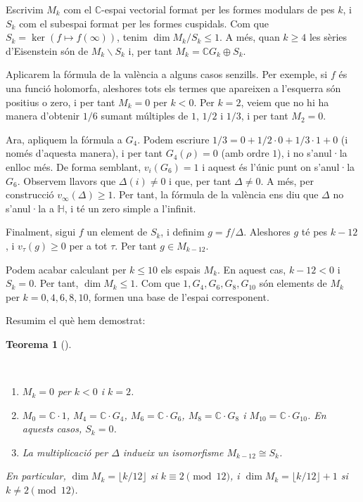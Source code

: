 \documentclass[
  letterpaper,
  DIV=11,
  numbers=noendperiod]{scrreprt}
\providecommand{\tightlist}{%
  \setlength{\itemsep}{0pt}\setlength{\parskip}{0pt}}\usepackage{longtable,booktabs,array}
\theoremstyle{plain}
\newtheorem{theorem}{Teorema}[chapter]
\theoremstyle{plain}
\theoremstyle{definition}
\theoremstyle{plain}
\theoremstyle{plain}
\theoremstyle{definition}
\theoremstyle{remark}
\begin{document}
Escrivim \(M_k\) com el \(\mathbb{C}\)-espai vectorial format per les
formes modulars de pes \(k\), i \(S_k\) com el subespai format per les
formes cuspidals. Com que \(S_k=\ker( f\mapsto f(\infty))\), tenim
\(\dim M_k/S_k\leq 1\). A més, quan \(k\geq 4\) les sèries d'Eisenstein
són de \(M_k\smallsetminus S_k\) i, per tant
\(M_k = \mathbb{C}G_k \oplus S_k\).

Aplicarem la fórmula de la valència a alguns casos senzills. Per
exemple, si \(f\) és una funció holomorfa, aleshores tots els termes que
apareixen a l'esquerra són positius o zero, i per tant \(M_k=0\) per
\(k<0\). Per \(k=2\), veiem que no hi ha manera d'obtenir \(1/6\) sumant
múltiples de \(1\), \(1/2\) i \(1/3\), i per tant \(M_2=0\).

Ara, apliquem la fórmula a \(G_4\). Podem escriure
\(1/3 = 0 + 1/2\cdot 0 + 1/3\cdot 1+0\) (i només d'aquesta manera), i
per tant \(G_4(\rho)=0\) (amb ordre \(1\)), i no s'anul·la enlloc més.
De forma semblant, \(v_{i}(G_6) = 1\) i aquest és l'únic punt on
s'anul·la \(G_6\). Observem llavors que \(\Delta(i)\neq 0\) i que, per
tant \(\Delta\neq 0\). A més, per construcció
\(v_{\infty}(\Delta)\geq 1\). Per tant, la fórmula de la valència ens
diu que \(\Delta\) no s'anul·la a \(\mathbb{H}\), i té un zero simple a
l'infinit.

Finalment, sigui \(f\) un element de \(S_k\), i definim \(g=f/\Delta\).
Aleshores \(g\) té pes \(k-12\), i \(v_{\tau}(g)\geq 0\) per a tot
\(\tau\). Per tant \(g\in M_{k-12}\).

Podem acabar calculant per \(k\leq 10\) els espais \(M_k\). En aquest
cas, \(k-12 < 0\) i \(S_k=0\). Per tant, \(\dim M_k\leq 1\). Com que
\(1, G_4, G_6, G_8, G_{10}\) són elements de \(M_k\) per
\(k=0, 4,6,8,10\), formen una base de l'espai corresponent.

Resumim el què hem demostrat:

\begin{theorem}[]\protect\hypertarget{thm-Mk}{}\label{thm-Mk}

~

\begin{enumerate}
\def\labelenumi{\arabic{enumi}.}
\tightlist
\item
  \(M_k=0\) per \(k<0\) i \(k=2\).
\item
  \(M_0=\mathbb{C}\cdot 1\), \(M_4=\mathbb{C}\cdot G_4\),
  \(M_6=\mathbb{C}\cdot G_6\), \(M_8=\mathbb{C}\cdot G_8\) i
  \(M_{10} = \mathbb{C}\cdot G_{10}\). En aquests casos, \(S_k=0\).
\item
  La multiplicació per \(\Delta\) indueix un isomorfisme
  \(M_{k-12}\cong S_k\).
\end{enumerate}

En particular, \(\dim M_k=\lfloor k/12\rfloor\) si
\(k\equiv 2 \pmod{12}\), i \(\dim M_k=\lfloor k/12\rfloor +1\) si
\(k\neq 2\pmod{12}\).

\end{theorem}
\end{document}
